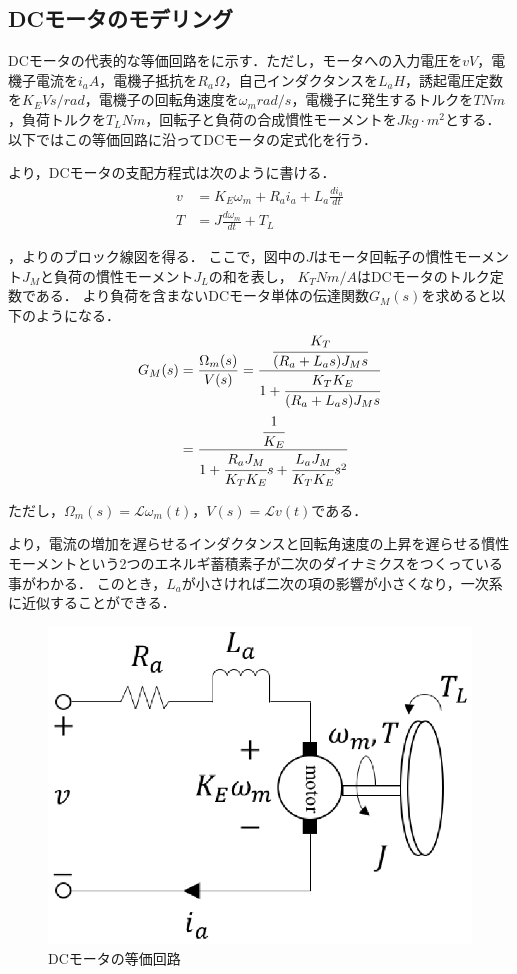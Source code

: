 \subsection{DCモータのモデリング}
DCモータの代表的な等価回路をに示す．\cite{dcmmodeling}ただし，モータへの入力電圧を$v\unit{V}$，電機子電流を$i_{a}\unit{A}$，電機子抵抗を$R_{a}\unit{\Omega}$，自己インダクタンスを$L_{a}\unit{H}$，誘起電圧定数を$K_{E}\unit{Vs/rad}$，電機子の回転角速度を$\omega_{m}\unit{rad/s}$，電機子に発生するトルクを$T\unit{Nm}$，負荷トルクを$T_L\unit{Nm}$，回転子と負荷の合成慣性モーメントを$J\unit{kg\cdot m^2}$とする．以下ではこの等価回路に沿ってDCモータの定式化を行う．

より，DCモータの支配方程式は次のように書ける．
\begin{align}
v &= K_{E}\omega_{m} + R_{a}i_{a} + L_{a}\frac{di_{a}}{dt} \label{eq::dcm_v} \\
T &= J\frac{d\omega_{m}}{dt} + T_{L} \label{eq::dcm_t}
\end{align}

，よりのブロック線図を得る．
ここで，図中の$J$はモータ回転子の慣性モーメント$J_{M}$と負荷の慣性モーメント$J_{L}$の和を表し，
$K_{T}\unit{Nm/A}$はDCモータのトルク定数である．
より負荷を含まないDCモータ単体の伝達関数$G_{M}(s)$を求めると以下のようになる．
\begin{align}
G_{M}(s) &= \frac{\Omega_{m}(s)}{V(s)} = 
\frac{\cfrac{K_{T}}{(R_{a} + L_{a}s)J_{M}s}}{1 + \cfrac{K_{T}K_{E}}{(R_{a} + L_{a}s)J_{M}s}} \nonumber \\
 &= \frac{\cfrac{1}{K_{E}}}{1 + \cfrac{R_{a}J_{M}}{K_{T}K_{E}}s + \cfrac{L_{a}J_{M}}{K_{T}K_{E}}s^2} \label{eq::dcm_tf}
\end{align}

ただし，$\Omega_{m}(s) = \mathcal{L}{\omega_{m}(t)}，V(s) = \mathcal{L}{v(t)}$である．

より，電流の増加を遅らせるインダクタンスと回転角速度の上昇を遅らせる慣性モーメントという2つのエネルギ蓄積素子が二次のダイナミクスをつくっている事がわかる．
このとき，$L_{a}$が小さければ二次の項の影響が小さくなり，一次系に近似することができる．

\begin{figure}[htb]
  \centering
    \includegraphics[width=0.5\hsize]{picture/eps/dcm_circit.eps}
    \caption{DCモータの等価回路}
    \label{fig::dcm_circit}
\end{figure}

